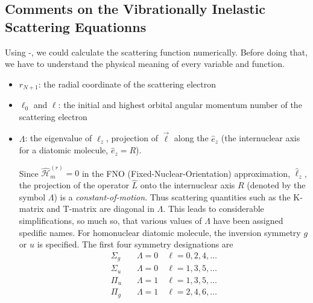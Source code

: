 \documentclass[aps,pra,groupedaddress,12pt,
               amsfonts,amssymb,
               preprint
    ]{revtex4}
\begin{document}
\subsection{Comments on the Vibrationally Inelastic Scattering Equationns}
\label{sec:comm-vibr-inel}
Using -, we could calculate the scattering function
numerically. Before doing that, we have to understand the physical
meaning of every variable and function.
\begin{itemize}
\item $r_{N+1}$: the radial coordinate of the scattering electron
\item $\ell_0$ and $\ell$: the initial and highest orbital angular
  momentum number of the scattering electron
\item $\Lambda$: the eigenvalue of $\ell_z$, projection of $\vec{\ell}$
  along the $\hat{e}_z$ (the internuclear axis for a diatomic molecule,
  $\hat{e}_z = R$). 

  Since $\hat{\mathcal{H}}_m^{(r)} = 0$ in the FNO
  (Fixed-Nuclear-Orientation) approximation, $\hat{\ell}_z$, the
  projection of the operator $\hat{L}$ onto the internuclear axis $R$
  (denoted by the symbol $\Lambda$) is a \textit{constant-of-motion}.
  Thus scattering quantities such as the K-matrix and T-matrix are
  diagonal in $\Lambda$. This leads to considerable simplifications, so
  much so, that various values of $\Lambda$ have been assigned spedific
  names. For homonuclear diatomic molecule, the inversion symmetry $g$
  or $u$ is specified. The first four symmetry designations are
  \begin{subequations}
    \begin{align}
      \label{eq:Lambda}
      \Sigma_g \quad & \Lambda = 0 \quad \ell = 0, 2, 4, \ldots \\
      \Sigma_u \quad & \Lambda = 0 \quad \ell = 1, 3, 5, \ldots \\
      \Pi_u    \quad & \Lambda = 1 \quad \ell = 1, 3, 5, \ldots \\
      \Pi_g    \quad & \Lambda = 1 \quad \ell = 2, 4, 6, \ldots 
    \end{align}
  \end{subequations}


\end{itemize}
\end{document}
